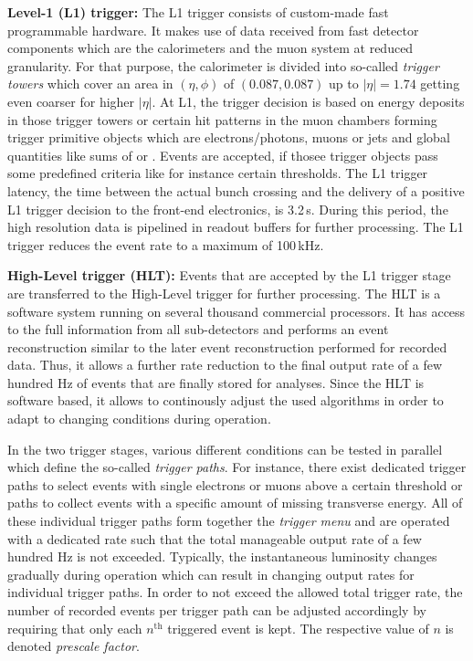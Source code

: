 \begin{description}
\item \textbf{Level-1 (L1) trigger:} The L1 trigger consists of custom-made fast programmable hardware. It makes use of data received from fast detector components which are the calorimeters and the muon system at reduced granularity. For that purpose, the calorimeter is divided into so-called \textit{trigger towers} which cover an area in $(\eta, \phi)$ of $(0.087, 0.087)$ up to $|\eta| = 1.74$ getting even coarser for higher $|\eta|$. At L1, the trigger decision is based on energy deposits in those trigger towers or certain hit patterns in the muon chambers forming trigger primitive objects which are electrons/photons, muons or jets and global quantities like sums of \et or \met. Events are accepted, if thosee trigger objects pass some predefined criteria like for instance certain \pt thresholds. The L1 trigger latency, \ie the time between the actual bunch crossing and the delivery of a positive L1 trigger decision to the front-end electronics, is 3.2\,\textmu s. During this period, the high resolution data is pipelined in readout buffers for further processing. The L1 trigger reduces the event rate to a maximum of 100\,kHz.
\item \textbf{High-Level trigger (HLT):} Events that are accepted by the L1 trigger stage are transferred to the High-Level trigger for further processing. The HLT is a software system running on several thousand commercial processors. It has access to the full information from all sub-detectors and performs an event reconstruction similar to the later event reconstruction performed for recorded data. Thus, it allows a further rate reduction to the final output rate of a few hundred Hz of events that are finally stored for analyses. Since the HLT is software based, it allows to continously adjust the used algorithms in order to adapt to changing conditions during operation.
\end{description}
In the two trigger stages, various different conditions can be tested in parallel which define the so-called \textit{trigger paths}. For instance, there exist dedicated trigger paths to select events with single electrons or muons above a certain \pt threshold or paths to collect events with a specific amount of missing transverse energy. All of these individual trigger paths form together the \textit{trigger menu} and are operated with a dedicated rate such that the total manageable output rate of a few hundred Hz is not exceeded. Typically, the instantaneous luminosity changes gradually during operation which can result in changing output rates for individual trigger paths. In order to not exceed the allowed total trigger rate, the number of recorded events per trigger path can be adjusted accordingly by requiring that only each $n^\mathrm{th}$ triggered event is kept. The respective value of $n$ is denoted \textit{prescale factor}. 

